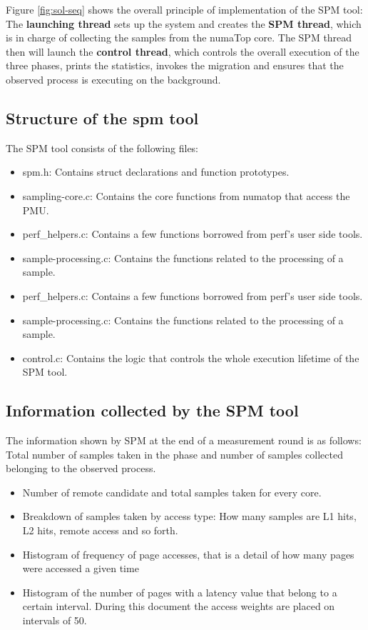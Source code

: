 Figure \ref{fig:sol-seq} shows the overall principle of implementation of the SPM tool: The \textbf{launching thread} sets up the system and creates the \textbf{SPM thread}, which is in charge of collecting the samples from the numaTop core. The SPM thread then will launch the \textbf{control thread}, which controls the overall execution of the three phases, prints the statistics, invokes the migration and ensures that the observed process is executing on the background.

\subsection{Structure of the spm tool}\label{subsection:spmstructr}

The SPM tool consists of the following files:
\begin{itemize}
	\item spm.h: Contains struct declarations and function prototypes.
	\item sampling-core.c: Contains the core functions from numatop that access the PMU.
		\item perf\_helpers.c: Contains a few functions borrowed from perf's user side tools.
	\item sample-processing.c: Contains the functions related to the processing of a sample.
	\item perf\_helpers.c: Contains a few functions borrowed from perf's user side tools.
	\item sample-processing.c: Contains the functions related to the processing of a sample.
	\item control.c: Contains the logic that controls the whole execution lifetime of the SPM tool.
\end{itemize}

\subsection{Information collected by the SPM tool}\label{subsection:spminf}

The information shown by SPM at the end of a measurement round is as follows:
Total number of samples taken in the phase and number of samples collected belonging to the observed process.
\begin{itemize}
	\item Number of remote candidate and total samples taken for every core.
	\item Breakdown of samples taken by access type: How many samples are L1 hits, L2 hits, remote access and so forth.
	\item Histogram of frequency of page accesses, that is a detail of how many pages were accessed a given time
	\item Histogram of the number of pages with a latency value that belong to a certain interval. During this document the access weights are placed on intervals of 50.
\end{itemize}

